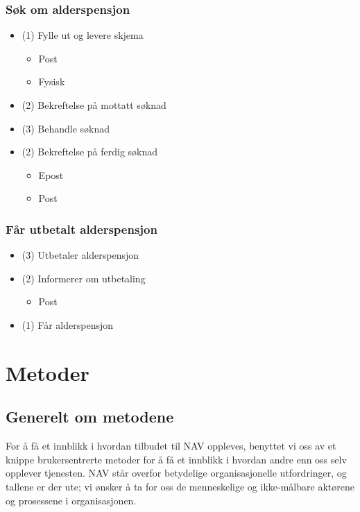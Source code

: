 \documentclass[informationsecurity]{gucmasterproject}
\begin{document}
\subsubsection{Søk om alderspensjon}
\begin{itemize}
\item (1) Fylle ut og levere skjema
	\begin{itemize}
	\item Post
	\item Fysisk
	\end{itemize}
\item (2) Bekreftelse på mottatt søknad
\item (3) Behandle søknad
\item (2) Bekreftelse på ferdig søknad
	\begin{itemize}
	\item Epost
	\item Post
	\end{itemize}
\end{itemize}

\subsubsection{Får utbetalt alderspensjon}
\begin{itemize}
\item (3) Utbetaler alderspensjon
\item (2) Informerer om utbetaling
	\begin{itemize}
	\item Post
	\end{itemize}
\item (1) Får alderspensjon
\end{itemize}



\section{Metoder}
\subsection{Generelt om metodene}
For å få et innblikk i hvordan tilbudet til NAV oppleves, benyttet vi oss av et knippe brukersentrerte metoder for å få et innblikk i hvordan andre enn oss selv opplever tjenesten. NAV står overfor betydelige organisasjonelle utfordringer, og tallene er der ute; vi ønsker å ta for oss de menneskelige og ikke-målbare aktørene og prosessene i organisasjonen.
\end{document}

